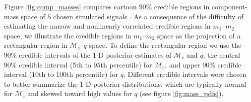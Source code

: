 Figure \ref{fig:comp_masses} compares cartoon $90\%$ credible regions in component-mass space of $5$ chosen simulated signals \citep[cf.][figure 1]{Chatziioannou_2014}.  As a consequence of the difficulty of estimating the narrow and nonlinearly correlated credible regions in $m_1$--$m_2$ space, we illustrate the credible regions in $m_1$--$m_2$ space as the projection of a rectangular region in $\mathcal{M}_\mathrm{c}$--$q$ space.  To define the rectangular region we use the $90\%$ credible intervals of the 1-D posterior estimates of $\mathcal{M}_\mathrm{c}$ and $q$; the central $90\%$ credible interval ($5$th to $95$th percentile) for $\mathcal{M}_\mathrm{c}$, and upper $90\%$ credible interval ($10$th to $100$th percentile) for $q$.  Different credible intervals were chosen to better summarize the 1-D posterior distributions, which are typically normal for $\mathcal{M}_\mathrm{c}$ and skewed toward high values for $q$ (see figure \ref{fig:mass_pdfs}).